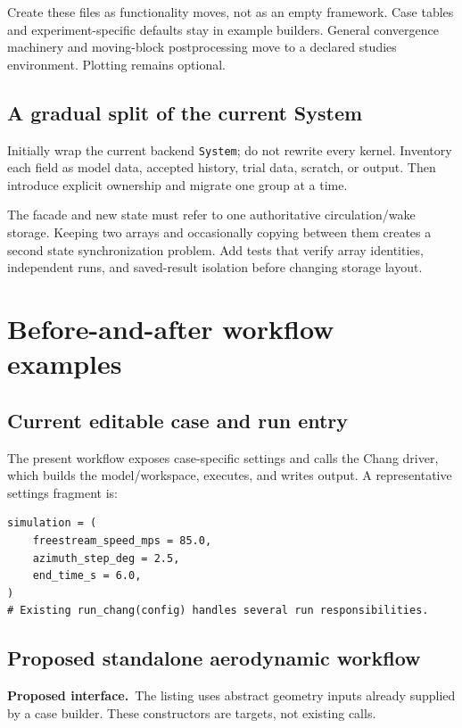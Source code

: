 \documentclass[11pt,a4paper]{article}
\newcommand{\code}{\nolinkurl}
\newcommand{\proposed}{\textbf{Proposed interface.}\ }
\begin{document}
Create these files as functionality moves, not as an empty framework.
Case tables and experiment-specific defaults stay in example builders.
General convergence machinery and moving-block postprocessing move to a
declared studies environment. Plotting remains optional.

\subsection{A gradual split of the current System}

Initially wrap the current backend \code{System}; do not rewrite every kernel.
Inventory each field as model data, accepted history, trial data, scratch,
or output. Then introduce explicit ownership and migrate one group at a time.

The facade and new state must refer to one authoritative circulation/wake
storage. Keeping two arrays and occasionally copying between them creates a
second state synchronization problem. Add tests that verify array identities,
independent runs, and saved-result isolation before changing storage layout.

\section{Before-and-after workflow examples}
\label{sec:workflow}

\subsection{Current editable case and run entry}

The present workflow exposes case-specific settings and calls the Chang
driver, which builds the model/workspace, executes, and writes output.
A representative settings fragment is:

\begin{lstlisting}
simulation = (
    freestream_speed_mps = 85.0,
    azimuth_step_deg = 2.5,
    end_time_s = 6.0,
)
# Existing run_chang(config) handles several run responsibilities.
\end{lstlisting}

\subsection{Proposed standalone aerodynamic workflow}

\proposed The listing uses abstract geometry inputs already supplied by a
case builder. These constructors are targets, not existing calls.
\end{document}
